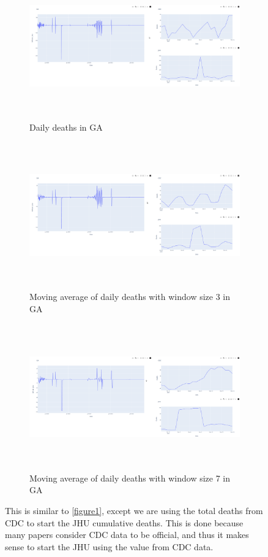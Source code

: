 \documentclass[11pt,twocolumn,letterpaper]{article}
\begin{document}
\begin{figure}
\centering
\begin{subfigure}{\linewidth}
    \centering
    \includegraphics[width=\linewidth, height=6.3cm]{images/comb_avg_1_ga.png}
    \caption{Daily deaths in GA}
\end{subfigure}
\hfill
\begin{subfigure}{\linewidth}
    \centering
    \includegraphics[width=\linewidth, height=6.3cm]{images/comb_avg_3_ga.png}
    \caption{Moving average of daily deaths with window size 3 in GA}
    \vfill
\end{subfigure}
\begin{subfigure}{\linewidth}
    \centering
    \includegraphics[width=\linewidth, height=6.3cm]{images/comb_avg_7_ga.png}
    \caption{Moving average of daily deaths with window size 7 in GA}
    \vfill
\end{subfigure}
\caption{This is similar to \cref{figure1}, except we are using the total deaths from CDC to start the JHU cumulative deaths. This is done because many papers consider CDC data to be official, and thus it makes sense to start the JHU using the value from CDC data.}
\label{figure2}
\end{figure}
\end{document}
